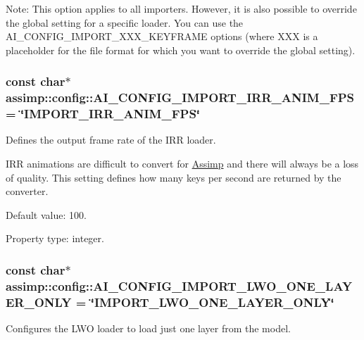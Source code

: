 Note\+: This option applies to all importers. However, it is also possible to override the global setting for a specific loader. You can use the A\+I\+\_\+\+C\+O\+N\+F\+I\+G\+\_\+\+I\+M\+P\+O\+R\+T\+\_\+\+X\+X\+X\+\_\+\+K\+E\+Y\+F\+R\+A\+M\+E options (where X\+X\+X is a placeholder for the file format for which you want to override the global setting). \hypertarget{namespaceassimp_1_1config_afae04fdd537f47da239818c7d7699d69}{
\subsubsection[{A\+I\+\_\+\+C\+O\+N\+F\+I\+G\+\_\+\+I\+M\+P\+O\+R\+T\+\_\+\+I\+R\+R\+\_\+\+A\+N\+I\+M\+\_\+\+F\+P\+S}]{\setlength{\rightskip}{0pt plus 5cm}const char$\ast$ assimp\+::config\+::\+A\+I\+\_\+\+C\+O\+N\+F\+I\+G\+\_\+\+I\+M\+P\+O\+R\+T\+\_\+\+I\+R\+R\+\_\+\+A\+N\+I\+M\+\_\+\+F\+P\+S = \char`\"{}I\+M\+P\+O\+R\+T\+\_\+\+I\+R\+R\+\_\+\+A\+N\+I\+M\+\_\+\+F\+P\+S\char`\"{}}}\label{namespaceassimp_1_1config_afae04fdd537f47da239818c7d7699d69}
Defines the output frame rate of the I\+R\+R loader.

I\+R\+R animations are difficult to convert for \hyperlink{class_assimp}{Assimp} and there will always be a loss of quality. This setting defines how many keys per second are returned by the converter.

Default value\+: 100.

Property type\+: integer. \hypertarget{namespaceassimp_1_1config_a80bb67e3c04b992ed7679a15825b0df2}{
\subsubsection[{A\+I\+\_\+\+C\+O\+N\+F\+I\+G\+\_\+\+I\+M\+P\+O\+R\+T\+\_\+\+L\+W\+O\+\_\+\+O\+N\+E\+\_\+\+L\+A\+Y\+E\+R\+\_\+\+O\+N\+L\+Y}]{\setlength{\rightskip}{0pt plus 5cm}const char$\ast$ assimp\+::config\+::\+A\+I\+\_\+\+C\+O\+N\+F\+I\+G\+\_\+\+I\+M\+P\+O\+R\+T\+\_\+\+L\+W\+O\+\_\+\+O\+N\+E\+\_\+\+L\+A\+Y\+E\+R\+\_\+\+O\+N\+L\+Y = \char`\"{}I\+M\+P\+O\+R\+T\+\_\+\+L\+W\+O\+\_\+\+O\+N\+E\+\_\+\+L\+A\+Y\+E\+R\+\_\+\+O\+N\+L\+Y\char`\"{}}}\label{namespaceassimp_1_1config_a80bb67e3c04b992ed7679a15825b0df2}
Configures the L\+W\+O loader to load just one layer from the model.

